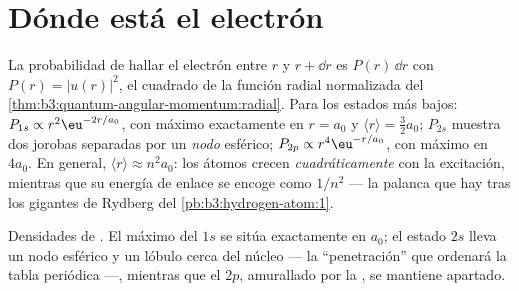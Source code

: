 \section{Dónde está el electrón}

\begin{proposition}\label{prop:b3:hydrogen-atom:radial}
La probabilidad de hallar el electrón entre $r$ y $r + \dd r$
es $P(r)\,\dd r$ con $P(r) = |u(r)|^2$, el cuadrado de la
función radial normalizada del \cref{thm:b3:quantum-angular-momentum:radial}. Para los estados más bajos:
$P_{1s} \propto r^2\eu^{-2r/a_0}$, con máximo exactamente en $r = a_0$ y
$\langle r\rangle = \tfrac32 a_0$; $P_{2s}$ muestra dos jorobas
separadas por un \emph{nodo} esférico; $P_{2p} \propto
r^4\eu^{-r/a_0}$, con máximo en $4a_0$. En general, $\langle r\rangle
\approx n^2a_0$: los átomos crecen \emph{cuadráticamente} con la
excitación, mientras que su energía de enlace se encoge como $1/n^2$ --- la palanca
que hay tras los gigantes de Rydberg del \cref{pb:b3:hydrogen-atom:1}.
\end{proposition}
\admitted

\begin{omfigure}

{\small Densidades de . El máximo del $1s$ se sitúa
exactamente en $a_0$; el estado $2s$ lleva un nodo esférico y un lóbulo
cerca del núcleo --- la ``penetración'' que ordenará la tabla periódica
---, mientras que el $2p$, amurallado por la , se
mantiene apartado.}
\end{omfigure}

